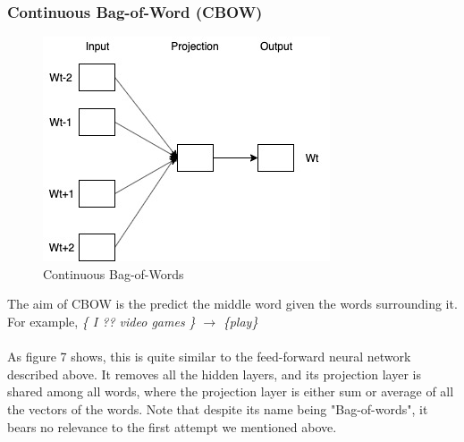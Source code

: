 \documentclass[paper=a4, fontsize=12pt]{scrartcl}
\begin{document}
\subsubsection{Continuous Bag-of-Word (CBOW)}
 \begin{figure}
  \includegraphics[scale=1]{cbow.jpg}
  \caption{Continuous Bag-of-Words}
  \label{fig:cbow}
\end{figure}
The aim of CBOW is the predict the middle word given the words surrounding it. \\
For example, \textit{ \{ I ?? video games \}} $\rightarrow$ \textit{\{play\}}\\\\
As figure 7 shows, this is quite similar to the feed-forward neural network described above.  It removes all the hidden layers, and its projection layer is shared among all words, where the projection layer is either sum or average of all the vectors of the words. Note that despite its name being "Bag-of-words", it bears no relevance to the first attempt we mentioned above. 
\end{document}
